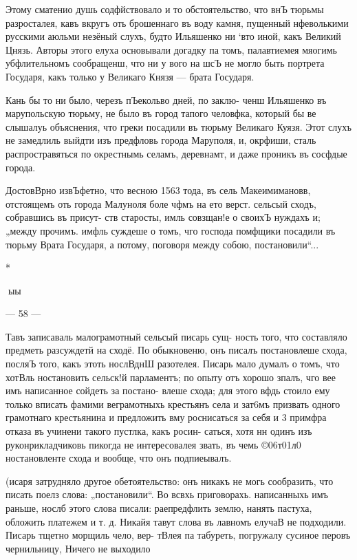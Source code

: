 Этому сматенио душь содфйствовало и то обстоятельство,
что внЪ тюрьмы разросталея, кавъ вкругъ оть брошеннаго
въ воду камня, пущенный нфеволькими русскими аюльми
незёный слухъ, будто Ильяшенко ни ‘вто иной, какъ Великий
Цнязь. Авторы этого елуха основывали догадку па томъ,
палавтиемея мяогимь убфлительномъ сообращенш, что ни у
вого на шсЪ не могло быть портрета Государя, какъ только
у Великаго Князя — брата Государя.

Кань бы то ни было, черезъ пЪекольво дней, по заклю-
ченш Ильяшенко въ марупольскую тюрьму, не было въ
город тапого человфка, который бы ве слышалуь объяснения,
что греки посадили въ тюрьму Великаго Куязя. Этот слухъ
не замедлиль выйдти изъ предфловь города Маруполя, и,
окрфиши, сталь распростравяться по окрестнымь селамъ,
деревнамт, и даже проникъ въ сосфдые города.

ДостовВрно извЪфетно, что весною 1563 тода, въ сель
Макеимимановв, отстоящемъ оть города Малуноля боле
чфмъ на ето верст. сельсый сходъ, собравшись въ присут-
ств старосты, имль совзщан!е о своихЪ нуждахъ и; „между
прочимъ. имфль суждеше о томъ, чго господа помфщики
посадили въ тюрьму Врата Государя, а потому, поговоря
между собою, постановили“...

*

ыы

— 58 —

Тавъ записаваль малограмотный сельсый писарь сущ-
ность того, что составляло предметь разсуждетй на сходё.
По обыкновеню, онъ писалъ постановлеше схода, посляЪ того,
какъ этоть нослВднШ разотелея. Писарь мало думалъ о томъ,
что хотВль ностановить сельск!й парламентъ; по опыту отъ
хорошо зпалъ, чго вее имъ написанное сойдеть за постано-
влеше схода; для этого вфдь стоило ему только вписать
фамими веграмотныхь крестьянъ села и зат6мъ призвать
одного грамотнаго крестьянина и предложить вму роснисаться
за себя и 3%
примфра отказа въ учинени такого пустлка, какъ росин-
саться, хотя нн одинъ изъ руконрикладчиковь пикогда не
интересовалея звать, въ чемь ©06т01л0 ностановленте схода
и вообще, что онъ подпиеывалъ.

(исаря затрудняло другое обетоятельство: онъ никакъ
не могь сообразить, что писать поелз слова: „постановили“.
Во всвхь приговорахь. написанныхь имъ раньше, нослб
этого слова писали: раепредфлить землю, нанять пастуха,
обложить платежем и т. д. Никайя тавут слова въ лавномъ
елучаВ не подходили. Писарь тщетно морщиль чело, вер-
тВлея па табуреть, погружалу сусиное перовъ чернильницу,
Ничего не выходило

